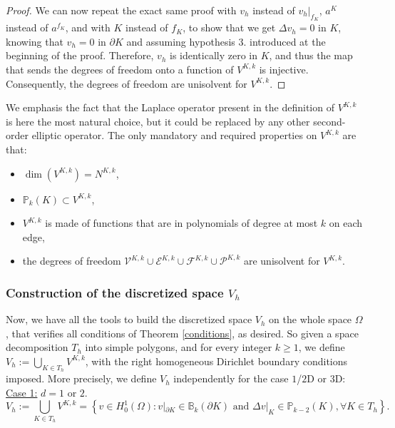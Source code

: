 \begin{proof}
We can now repeat the exact same proof with $v_h$ instead of $v_h|_{f_K}$, $a^K$ instead of $a^{f_K}$, and with $K$ instead of $f_K$, to show that we get $\Delta v_h = 0$ in $K$, knowing that $v_h = 0$ in $\partial K$ and assuming hypothesis $3.$ introduced at the beginning of the proof. Therefore, $v_h$ is identically zero in $K$, and thus the map that sends the degrees of freedom onto a function of $V^{K,k}$ is injective. Consequently, the degrees of freedom are unisolvent for $V^{K,k}$. 
\end{proof}

\begin{remark}
We emphasis the fact that the Laplace operator present in the definition of $V^{K,k}$ is here the most natural choice, but it could be replaced by any other second-order elliptic operator. The only mandatory and required properties on $V^{K,k}$ are that: 
\begin{itemize}
\item $\dim\left(V^{K,k}\right) = N^{K,k}$, 
\item $\mathbb{P}_{k}(K)\subset V^{K,k}$, 
\item $V^{K,k}$ is made of functions that are in polynomials of degree at most $k$ on each edge, 
\item the degrees of freedom $\mathcal{V}^{K,k}\cup\mathcal{E}^{K,k}\cup \mathcal{F}^{K,k}\cup\mathcal{P}^{K,k}$ are unisolvent for $V^{K,k}$.
\end{itemize}
\end{remark}

\subsubsection{Construction of the discretized space $V_h$}
Now, we have all the tools to build the discretized space $V_h$ on the whole space $\Omega$, that verifies all conditions of Theorem \ref{conditions}, as desired. So given a space decomposition $T_h$ into simple polygons, and for every integer $k\geq 1$, we define $V_h:=\bigcup_{K\in T_h} V^{K,k}$, with the right homogeneous Dirichlet boundary conditions imposed. More precisely, we define $V_h$ independently for the case $1$/$2$D or $3$D:\\

\noindent \underline{Case 1:} $d=1$ or $2$.
$$
V_h := \bigcup_{K\in T_h} V^{K,k} = \left\{v\in H^1_0(\Omega): v|_{\partial K} \in \mathbb{B}_k(\partial K) \text{ and } \Delta v|_K \in \mathbb{P}_{k-2}(K), \forall K\in T_h \right\}.
$$

